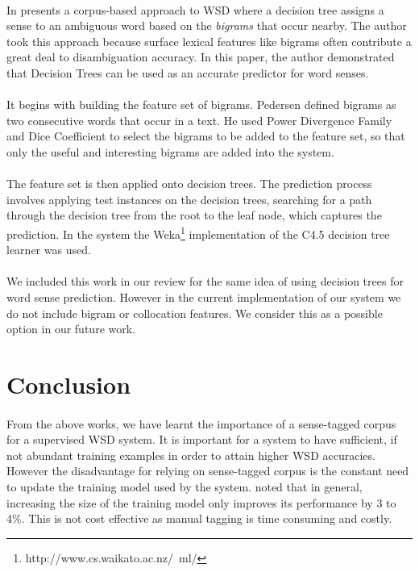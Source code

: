 \paragraph{}
In \cite{pederson} presents a corpus-based approach to WSD where a decision tree assigns a sense to an ambiguous word based on the \textit{bigrams} that occur nearby. The author took this approach because surface lexical features like bigrams often contribute a great deal to disambiguation accuracy. In this paper, the author demonstrated that Decision Trees can be used as an accurate predictor for word senses.

\paragraph{}
It begins with building the feature set of bigrams. Pedersen defined bigrams as two consecutive words that occur in a text. He used Power Divergence Family and Dice Coefficient to select the bigrams to be added to the feature set, so that only the useful and interesting bigrams are added into the system.

\paragraph{}
The feature set is then applied onto decision trees. The prediction process involves applying test instances on the decision trees, searching for a path through the decision tree from the root to the leaf node, which captures the prediction. In the system the Weka\footnote{http://www.cs.waikato.ac.nz/~ml/} implementation of the C4.5 decision tree learner was used.

\paragraph{}
We included this work in our review for the same idea of using decision trees for word sense prediction. However in the current implementation of our system we do not include bigram or collocation features. We consider this as a possible option in our future work.

\section{Conclusion}
\paragraph{}
From the above works, we have learnt the importance of a sense-tagged corpus for a supervised WSD system. It is important for a system to have sufficient, if not abundant training examples in order to attain higher WSD accuracies. However the disadvantage for relying on sense-tagged corpus is the constant need to update the training model used by the system. \cite{noisychannel} noted that in general, increasing the size of the training model only improves its performance by 3 to 4\%. This is not cost effective as manual tagging is time consuming and costly.

